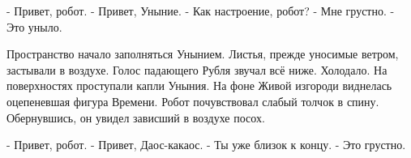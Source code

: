 - Привет, робот.
- Привет, Уныние.
- Как настроение, робот?
- Мне грустно.
- Это уныло.

Пространство начало заполняться Унынием. Листья, прежде уносимые ветром, застывали в воздухе. Голос падающего Рубля звучал всё ниже. Холодало. На поверхностях проступали капли Уныния. На фоне Живой изгороди виднелась оцепеневшая фигура Времени. Робот почувствовал слабый толчок в спину. Обернувшись, он увидел зависший в воздухе посох.

- Привет, робот.
- Привет, Даос-какаос.
- Ты уже близок к концу.
- Это грустно.